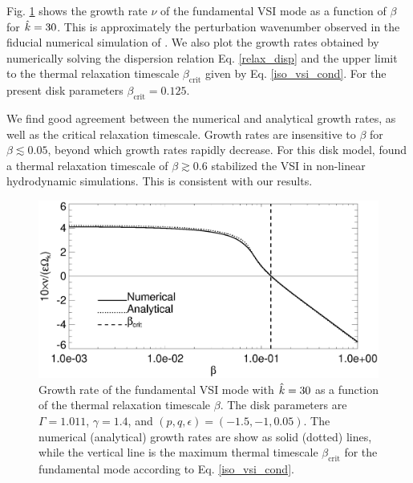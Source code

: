Fig. \ref{bcrit_compare1} shows the growth rate $\nu$ of the
fundamental VSI mode as a function of $\beta$ for $\hat{k}=30$. This is
approximately the perturbation wavenumber observed in the fiducial
numerical simulation of \cite{nelson13}. We also plot the growth rates
obtained by numerically solving the dispersion relation 
Eq. \ref{relax_disp} and the upper limit to 
the thermal relaxation timescale $\beta_\mathrm{crit}$ given by
Eq. \ref{iso_vsi_cond}. For the present disk parameters
$\beta_\mathrm{crit}=0.125$. 

We find good agreement between the numerical and analytical growth
rates, as well as the critical relaxation timescale. Growth rates are
insensitive to $\beta$ for $\beta\lesssim 0.05$, beyond which growth
rates rapidly decrease. For this disk model, \citeauthor{nelson13}
found a thermal relaxation timescale of $\beta\gtrsim 0.6$ stabilized
the VSI in non-linear hydrodynamic simulations. This is consistent
with our results.   


 \begin{figure}
   \includegraphics[width=\linewidth]{figures/bcrit_compare} 
   \caption{Growth rate of the fundamental VSI mode with $\hat{k}=30$ as
     a function of the thermal relaxation timescale $\beta$. The disk
     parameters are $\Gamma=1.011$, $\gamma=1.4$, and 
     $(p,q,\epsilon)=(-1.5,-1,0.05)$. The numerical (analytical) growth
     rates are show as solid (dotted) lines, while the vertical line
     is the maximum thermal timescale $\beta_\mathrm{crit}$ for the
     fundamental mode according to Eq. \ref{iso_vsi_cond}. 
     \label{bcrit_compare1}}   
 \end{figure} 



